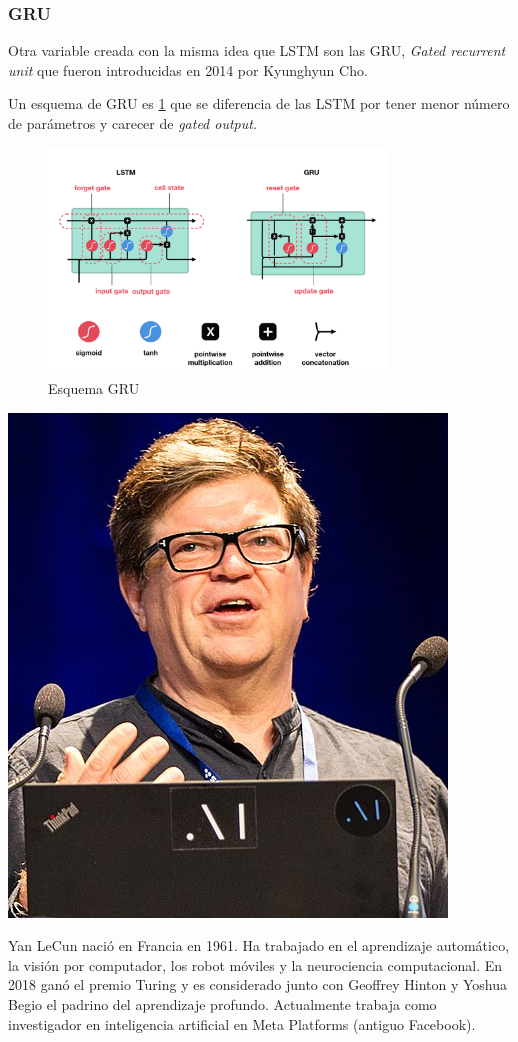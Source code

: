 \documentclass[11pt,twoside,titlepage,a4paper]{article}
\newcommand{\margenimagen}{
\newgeometry{
    left=2.5cm, %
	right=5cm, %
	bottom=2.5cm %
}
}
\numberwithin{equation}{section} %
\theoremstyle{usual}
\begin{document}
\subsubsection{GRU}  

Otra variable creada con la misma idea que LSTM son las GRU, \textit{Gated recurrent unit} que fueron introducidas en 2014 por Kyunghyun Cho. 

Un esquema de GRU es \ref{fig:esquema-GRU} \cite{GRU-web} que se diferencia de las LSTM por tener menor número de parámetros y carecer de \textit{gated output}. 
\margenimagen
    \begin{figure}[!h]
        \centering
        \includegraphics[width=0.8\textwidth]{Source/images/GRU.png}
        \caption{Esquema GRU}
        \label{fig:esquema-GRU}
    \end{figure}
\begin{marginfigure}
    \includegraphics[width=\marginparwidth]{Source/images/Yann_LeCun.jpg}
    \caption{Yan LeCun nació en Francia en 1961. Ha trabajado en el aprendizaje automático, la visión por computador, los robot móviles y la neurociencia computacional. En 2018 ganó el premio Turing y es considerado junto con Geoffrey Hinton y Yoshua Begio el padrino del aprendizaje profundo. Actualmente trabaja como investigador en inteligencia artificial en Meta Platforms (antiguo Facebook).}
\end{marginfigure}
\end{document}

